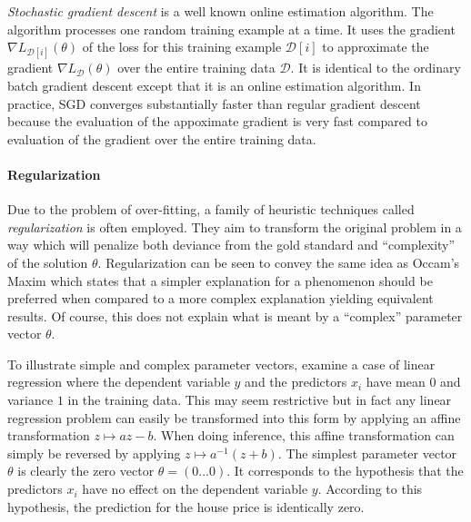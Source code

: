 {\it Stochastic gradient descent} is a well known online estimation
algorithm. The algorithm processes one random training example at a
time. It uses the gradient $\nabla L_{\mathcal{D}[i]}(\theta)$ of the
loss for this training example $\mathcal{D}[i]$ to approximate the
gradient $\nabla L_{\mathcal{D}}(\theta)$ over the entire training
data $\mathcal{D}$. It is identical to the ordinary batch gradient
descent except that it is an online estimation algorithm. In practice,
SGD converges substantially faster than regular gradient descent
\citep{Vishwanathan2006} because the evaluation of the appoximate
gradient is very fast compared to evaluation of the gradient over the
entire training data.


\paragraph{Regularization} Due to the problem of over-fitting, a
family of heuristic techniques called {\it regularization} is often
employed. They aim to transform the original problem in a way which
will penalize both deviance from the gold standard and ``complexity''
of the solution $\theta$. Regularization can be seen to convey the
same idea as Occam's Maxim which states that a simpler explanation for
a phenomenon should be preferred when compared to a more complex
explanation yielding equivalent results. Of course, this does not
explain what is meant by a ``complex'' parameter vector
$\theta$.

To illustrate simple and complex parameter vectors, examine a case of
linear regression where the dependent variable $y$ and the predictors
$x_i$ have mean $0$ and variance $1$ in the training data. This may
seem restrictive but in fact any linear regression problem can easily
be transformed into this form by applying an affine transformation $z
\mapsto az - b$. When doing inference, this affine transformation can
simply be reversed by applying $z \mapsto a^{-1} (z + b)$. The
simplest parameter vector $\theta$ is clearly the zero vector $\theta
= (0 ... 0)$. It corresponds to the hypothesis that the
predictors $x_i$ have no effect on the dependent variable
$y$. According to this hypothesis, the prediction for the house price
is identically zero.

